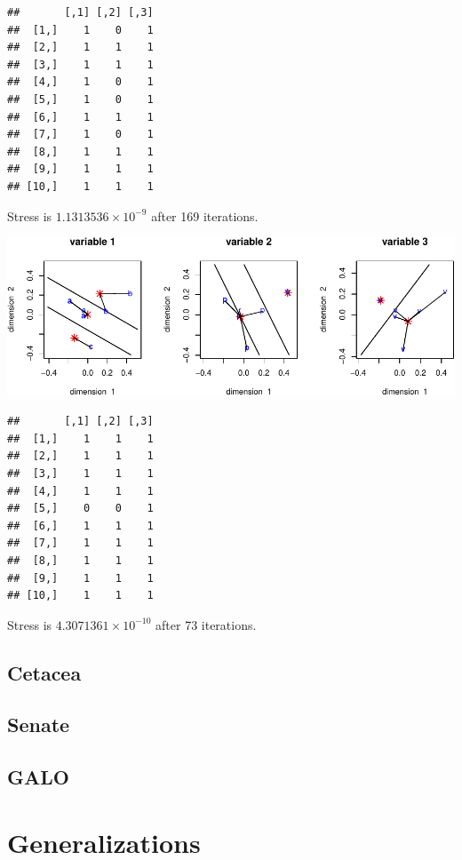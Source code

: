 \documentclass[
  12pt,
]{article}
\begin{document}
\begin{verbatim}
##       [,1] [,2] [,3]
##  [1,]    1    0    1
##  [2,]    1    1    1
##  [3,]    1    1    1
##  [4,]    1    0    1
##  [5,]    1    0    1
##  [6,]    1    1    1
##  [7,]    1    0    1
##  [8,]    1    1    1
##  [9,]    1    1    1
## [10,]    1    1    1
\end{verbatim}

Stress is \ensuremath{1.1313536\times 10^{-9}} after 169 iterations.

\begin{center}\includegraphics{smacofHC_files/figure-latex/small10-1} \end{center}

\begin{verbatim}
##       [,1] [,2] [,3]
##  [1,]    1    1    1
##  [2,]    1    1    1
##  [3,]    1    1    1
##  [4,]    1    1    1
##  [5,]    0    0    1
##  [6,]    1    1    1
##  [7,]    1    1    1
##  [8,]    1    1    1
##  [9,]    1    1    1
## [10,]    1    1    1
\end{verbatim}

Stress is \ensuremath{4.3071361\times 10^{-10}} after 73 iterations.

\subsection{Cetacea}\label{cetacea}

\subsection{Senate}\label{senate}

\subsection{GALO}\label{galo}

\section{Generalizations}\label{generalizations}
\end{document}
